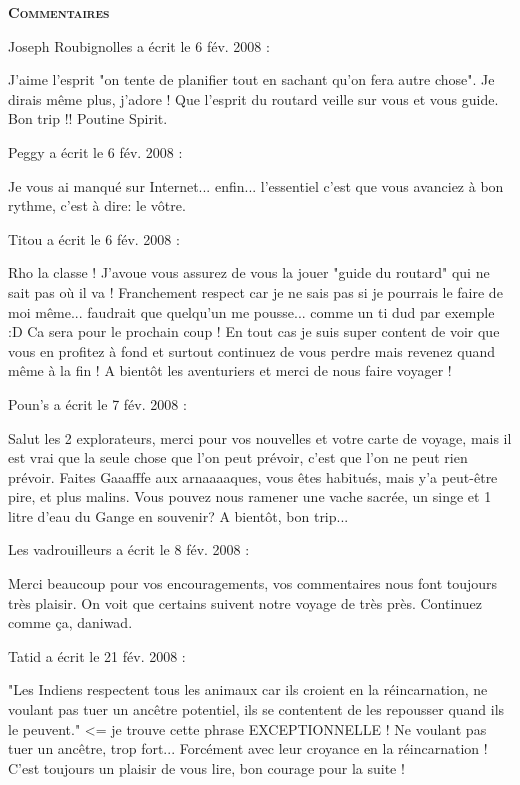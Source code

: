 \bigskip
\textbf{\textsc{Commentaires}}

\medskip
Joseph Roubignolles a écrit le 6 fév. 2008 :
\begin{displayquote}
J'aime l'esprit "on tente de planifier tout en sachant qu'on fera autre chose". Je dirais même plus, j'adore ! Que l'esprit du routard veille sur vous et vous guide.
Bon trip !!
Poutine Spirit.
\end{displayquote}

\medskip
Peggy a écrit le 6 fév. 2008 :
\begin{displayquote}
Je vous ai manqué sur Internet... enfin... l'essentiel c'est que vous avanciez à bon rythme, c'est à dire: le vôtre.
\end{displayquote}

\medskip
Titou a écrit le 6 fév. 2008 :
\begin{displayquote}
Rho la classe ! J'avoue vous assurez de vous la jouer "guide du routard" qui ne sait pas où il va ! Franchement respect car je ne sais pas si je pourrais le faire de moi même... faudrait que quelqu'un me pousse... comme un ti dud par exemple :D Ca sera pour le prochain coup ! En tout cas je suis super content de voir que vous en profitez à fond et surtout continuez de vous perdre mais revenez quand même à la fin ! A bientôt les aventuriers et merci de nous faire voyager !
\end{displayquote}

\medskip
Poun's a écrit le 7 fév. 2008 :
\begin{displayquote}
Salut  les 2 explorateurs, merci pour vos nouvelles et votre carte de voyage, mais il est vrai que la seule chose que l'on peut prévoir, c'est que l'on ne peut rien prévoir. Faites Gaaafffe aux arnaaaaques, vous êtes habitués, mais y'a peut-être pire, et plus malins.
Vous pouvez nous ramener une vache sacrée, un singe et 1 litre d'eau du Gange en souvenir?
A bientôt, bon trip...
\end{displayquote}

\medskip
Les vadrouilleurs a écrit le 8 fév. 2008 :
\begin{displayquote}
Merci beaucoup pour vos encouragements, vos commentaires nous font toujours très plaisir. On voit que certains suivent notre voyage de très près.
Continuez comme ça, daniwad.
\end{displayquote}

\medskip
Tatid a écrit le 21 fév. 2008 :
\begin{displayquote}
"Les Indiens respectent tous les animaux car ils croient en la réincarnation, ne voulant pas tuer un ancêtre potentiel, ils se contentent de les repousser quand ils le peuvent." <= je trouve cette phrase EXCEPTIONNELLE ! Ne voulant pas tuer un ancêtre, trop fort... Forcément avec leur croyance en la réincarnation !
C'est toujours un plaisir de vous lire, bon courage pour la suite !
\end{displayquote}

\vfill

